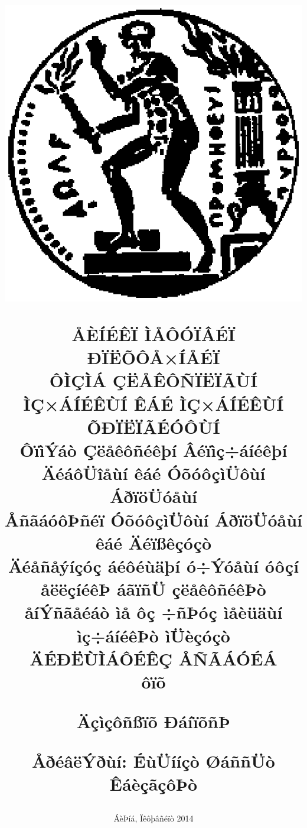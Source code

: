 \documentclass[12pt, twoside, a4paper]{book}
\begin{document}
\thispagestyle{empty}
\title{
\vspace{-6ex}
\begin{center}
\includegraphics[scale=1]{pyrforos.eps}
\end{center}
\Large{Å}\large{ÈÍÉÊÏ}
\Large{Ì}\large{ÅÔÓÏÂÉÏ}
\Large{Ð}\large{ÏËÕÔÅ×ÍÅÉÏ} \\
\normalsize{Ô}\small{ÌÇÌÁ}
\normalsize{Ç}\small{ËÅÊÔÑÏËÏÃÙÍ}
\normalsize{Ì}\small{Ç×ÁÍÉÊÙÍ}
\normalsize{Ê}\small{ÁÉ}
\normalsize{Ì}\small{Ç×ÁÍÉÊÙÍ}
\normalsize{Õ}\small{ÐÏËÏÃÉÓÔÙÍ} \\
\vspace{2ex}
ÔïìÝáò Çëåêôñéêþí Âéïìç÷áíéêþí ÄéáôÜîåùí êáé ÓõóôçìÜôùí ÁðïöÜóåùí \\
ÅñãáóôÞñéï ÓõóôçìÜôùí ÁðïöÜóåùí êáé Äéïßêçóçò \\
\vspace{8ex}
\large \textbf{Äéåñåýíçóç áéôéùäþí ó÷Ýóåùí óôçí åëëçíéêÞ áãïñÜ çëåêôñéêÞò åíÝñãåéáò ìå ôç ÷ñÞóç ìåèüäùí ìç÷áíéêÞò ìÜèçóçò} \\
\vspace{7ex}
\large
ÄÉÐËÙÌÁÔÉÊÇ ÅÑÃÁÓÉÁ \\
\vspace{2ex}
\normalsize
ôïõ \\
\vspace{2ex}
\parbox[c]{0.4\textwidth} { \center\textbf{
Äçìçôñßïõ ÐáíïõñÞ}}
\vspace{10ex}
\flushleft
\begin{tabbing}
	\textbf{ÅðéâëÝðùí}: \= ÉùÜííçò ØáññÜò
				\\
			    \> ÊáèçãçôÞò
\end{tabbing}
}
\date{
\normalsize
ÁèÞíá, Ïêôþâñéïò 2014}
\end{document}
